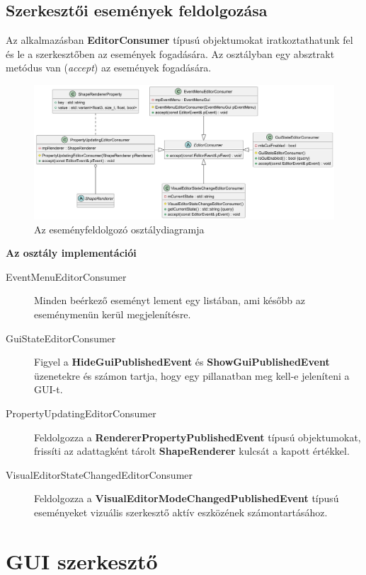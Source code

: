 \subsection{Szerkesztői események feldolgozása}

Az alkalmazásban \textbf{EditorConsumer} típusú objektumokat iratkoztathatunk fel és le a szerkesztőben az események fogadására. Az osztályban egy absztrakt metódus van (\textit{accept}) az események fogadására.

\begin{figure}[H]
    \centering
    \includegraphics[width=1\linewidth]{images/class_editor_consumer.png}
    \caption{Az eseményfeldolgozó osztálydiagramja}
    \label{fig:class_editor_consumer-1}
\end{figure}

\textbf{Az osztály implementációi}

\begin{description}
    \item[EventMenuEditorConsumer] Minden beérkező eseményt lement egy listában, ami később az eseménymenün kerül megjelenítésre.
    \item[GuiStateEditorConsumer] Figyel a \textbf{HideGuiPublishedEvent} és \textbf{ShowGuiPublishedEvent} üzenetekre és számon tartja, hogy egy pillanatban meg kell-e jeleníteni a GUI-t.
    \item[PropertyUpdatingEditorConsumer] Feldolgozza a \textbf{RendererPropertyPublishedEvent} típusú objektumokat, frissíti az adattagként tárolt \textbf{ShapeRenderer} kulcsát a kapott értékkel.
    \item[VisualEditorStateChangedEditorConsumer] Feldolgozza a \textbf{VisualEditorModeChangedPublishedEvent} típusú eseményeket vizuális szerkesztő aktív eszközének számontartásához.
\end{description}


\section{GUI szerkesztő}

